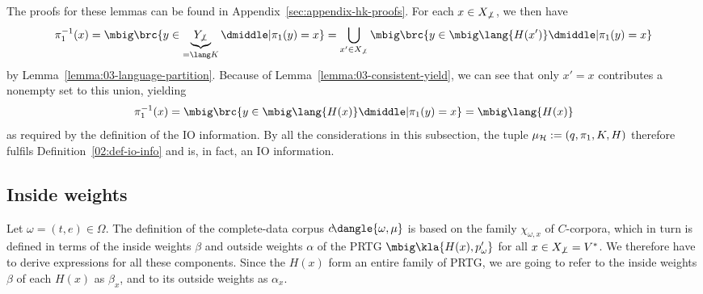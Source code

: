 The proofs for these lemmas can be found in Appendix~\ref{sec:appendix-hk-proofs}. For each $x\in X_{\not\bot}$, we then have
\[
 \pi_1^{-1}(x)
 = \mbig\brc{y\in \underbrace{Y_{\not\bot}}_{=\lang K} \pipe \pi_1(y) = x}
 = \bigcup_{x'\in X_{\not\bot}} \mbig\brc{y\in\mbig\lang{H(x')} \pipe \pi_1(y) = x}
\]
by Lemma~\ref{lemma:03-language-partition}. Because of
Lemma~\ref{lemma:03-consistent-yield}, we can see that only $x'=x$ contributes
a nonempty set to this union, yielding
\[
 \pi_1^{-1}(x) = \mbig\brc{y\in\mbig\lang{H(x)} \pipe \pi_1(y) = x} = \mbig\lang{H(x)}
\]
as required by the definition of the IO information. By all the considerations
in this subsection, the tuple $\mu_\mathcal H := (q,\pi_1,K,H)$ therefore fulfils
Definition~\ref{02:def-io-info} and is, in fact, an IO information.


\subsection{Inside weights}

Let $\omega = (t,e)\in\Omega$. The definition of the complete-data corpus
$c\!\dangle{\omega,\mu}$ is based on the family $\chi_{\omega,x}$ of
$C$-corpora, which in turn is defined in terms of the inside weights $\beta$
and outside weights $\alpha$ of the PRTG $\mbig\kla{H(x),p_\omega'}$ for all
$x\in X_{\not\bot}=V^*$. We therefore have to derive expressions for all these
components. Since the $H(x)$ form an entire family of PRTG, we are going to
refer to the inside weights $\beta$ of each $H(x)$ as $\beta_x$, and to its
outside weights as $\alpha_x$.

